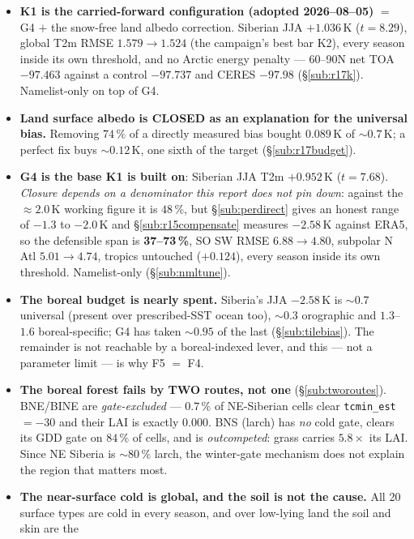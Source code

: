 \documentclass[10pt]{article}
\begin{document}
\begin{itemize}\itemsep2pt
\item \textbf{K1 is the carried-forward configuration (adopted 2026--08--05)} $=$ G4 $+$ the
  snow-free land albedo correction. Siberian JJA $+1.036$\,K ($t{=}8.29$), global T2m RMSE
  $1.579\to\mathbf{1.524}$ (the campaign's best bar K2), every season inside its own
  threshold, and no Arctic energy penalty --- 60--90N net TOA $-97.463$ against a control
  $-97.737$ and CERES $-97.98$ (\S\ref{sub:r17k}). Namelist-only on top of G4.
\item \textbf{Land surface albedo is CLOSED as an explanation for the universal bias.}
  Removing $74\,\%$ of a directly measured bias bought $0.089$\,K of ${\sim}0.7$\,K; a perfect
  fix buys ${\sim}0.12$\,K, one sixth of the target (\S\ref{sub:r17budget}).
\item \textbf{G4 is the base K1 is built on}: Siberian JJA T2m $+0.952$\,K
  ($t{=}7.68$). \emph{Closure depends on a denominator this report does not pin down}:
  against the $\approx2.0$\,K working figure it is $48\,\%$, but \S\ref{sub:perdirect} gives an
  honest range of $-1.3$ to $-2.0$\,K and \S\ref{sub:r15compensate} measures $-2.58$\,K against
  ERA5, so the defensible span is \textbf{37--73\,\%}, SO SW RMSE $6.88\to4.80$, subpolar N Atl $5.01\to4.74$,
  tropics untouched ($+0.124$), every season inside its own threshold. Namelist-only
  (\S\ref{sub:nmltune}).
\item \textbf{The boreal budget is nearly spent.} Siberia's JJA $-2.58$\,K is
  ${\sim}0.7$ universal (present over prescribed-SST ocean too), ${\sim}0.3$ orographic and
  $1.3$--$1.6$ boreal-specific; G4 has taken ${\sim}0.95$ of the last (\S\ref{sub:tilebias}).
  The remainder is not reachable by a boreal-indexed lever, and this --- not a parameter
  limit --- is why F5 $=$ F4.
\item \textbf{The boreal forest fails by TWO routes, not one} (\S\ref{sub:tworoutes}).
  BNE/BINE are \emph{gate-excluded} --- $0.7\,\%$ of NE-Siberian cells clear
  \texttt{tcmin\_est}$=-30$ and their LAI is exactly $0.000$. BNS (larch) has \emph{no} cold
  gate, clears its GDD gate on $84\,\%$ of cells, and is \emph{outcompeted}: grass carries
  $5.8\times$ its LAI. Since NE Siberia is ${\sim}80\,\%$ larch, the winter-gate mechanism
  does not explain the region that matters most.
\item \textbf{The near-surface cold is global, and the soil is not the cause.} All 20 surface
  types are cold in every season, and over low-lying land the soil and skin are the

\end{itemize}
\end{document}
